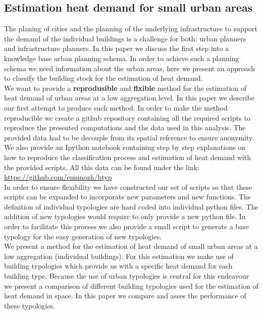 \documentclass[authoryear,preprint,review,12pt]{elsarticle}
\begin{document}
\begin{linenumbers}

\section{Estimation heat demand for small urban areas}

The planing of cities and the planning of the underlying infrastructure to
support the demand of the individual buildings is a challenge for both: urban
planners and infrastructure planners. In this paper we discuss the first step
into a knowledge base urban planning schema. In order to achieve such a
planning schema we need information about the urban areas, here we present an
approach to classify the building stock for the estimation of heat demand.\\

We want to provide a \textbf{reprodusible} and \textbf{flxible} method for the
estimation of heat demand of urban areas at a low aggregation level. In this
paper we describe our first attempt to produce such method. In order to make
the method reproducible we create a github repository containing all the
required scripts to reproduce the presented computations and the data used in
this analysis. The provided data had to be decouple from its spatial reference
to ensure anonymity. We also provide an Ipython notebook containing step by
step explanations on how to reproduce the classification process and estimation
of heat demand with the provided scripts. All this data can be found under the
link: \url{https://github.com/emunozh/btyp}\\

In order to ensure flexibility we have constructed our set of scripts so that
these scripts can be expanded to incorporate new parameters and new functions.
The definition of individual typologies are hard coded into individual python
files. The addition of new typologies would require to only provide a new
python file. In order to facilitate this process we also provide a small script
to generate a base typology for the easy generation of new typologies.\\

We present a method for the estimation of heat demand of small urban areas at a
low aggregation (individual buildings). For this estimation we make use of
building typologies which provide us with a specific heat demand for each
building type. Because the use of urban typologies is central for this
endeavour we present a comparison of different building typologies used for the
estimation of heat demand in space. In this paper we compare and asses the
performance of these typologies.\\


\end{linenumbers}
\end{document}
